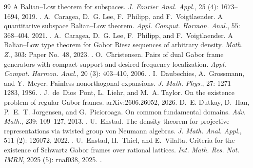 \documentclass[11pt,reqno]{amsart}
\numberwithin{equation}{section}
\theoremstyle{definition}
\theoremstyle{remark}
\begin{document}
\begin{thebibliography}{99}
\newblock A {B}alian--{L}ow theorem for subspaces.
\newblock \emph{J. Fourier Anal. Appl.}, 25 (4):
  1673--1694, 2019.
\newblock {}.
A.~Caragea, D.~G. Lee, F.~Philipp, and F.~Voigtlaender.
\newblock A quantitative subspace {B}alian--{L}ow theorem.
\newblock \emph{Appl. Comput. Harmon. Anal.}, 55: 368--404, 2021.
\newblock {}.
A.~Caragea, D.~G. Lee, F.~Philipp, and F.~Voigtlaender.
\newblock A {B}alian--{L}ow type theorem for {G}abor {R}iesz sequences of
  arbitrary density.
\newblock \emph{Math. Z.}, 303: Paper No.~48, 2023.
\newblock {}.
O.~Christensen.
\newblock Pairs of dual {G}abor frame generators with compact support and desired frequency localization.
\newblock \emph{Appl. Comput. Harmon. Anal.}, 20 (3): 403--410, 2006.
\newblock {}.
I.~Daubechies, A.~Grossmann, and Y.~Meyer.
\newblock Painless nonorthogonal expansions.
\newblock \emph{J. Math. Phys.}, 27: 1271--1283, 1986.
\newblock {}.
J.~de~Dios~Pont, L.~Liehr, and M.~A. Taylor.
\newblock On the existence problem of regular {G}abor frames.
\newblock arXiv:2606.26052, 2026.
D.~E. Dutkay, D.~Han, P.~E.~T. Jorgensen, and G.~Picioroaga.
\newblock On common fundamental domains.
\newblock \emph{Adv. Math.}, 239: 109--127, 2013.
\newblock {}.
U.~Enstad.
\newblock The density theorem for projective representations via twisted group
  von {N}eumann algebras.
\newblock \emph{J. Math. Anal. Appl.}, 511 (2): 126072, 2022.
\newblock {}.
U.~Enstad, H.~Thiel, and E.~Vilalta.
\newblock Criteria for the existence of {S}chwartz {G}abor frames over rational
  lattices.
\newblock \emph{Int. Math. Res. Not. IMRN}, 2025 (5):
  rnaf038, 2025.
\newblock {}.

\end{thebibliography}
\end{document}
